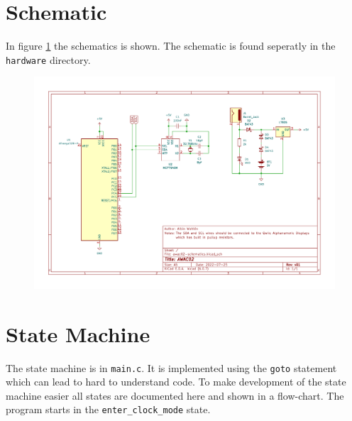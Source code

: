 \documentclass{awac02}
\begin{document}
\section{Schematic}

In figure \ref{fig:schematic} the schematics is shown. The schematic is found
seperatly in the \texttt{hardware} directory.

\begin{figure}[h]
    \includegraphics[width=\textwidth]{../hardware/AWAC02-v01}
    \label{fig:schematic}
\end{figure}

\section{State Machine}

The state machine is in \texttt{main.c}. It is implemented using the
\texttt{goto} statement which can lead to hard to understand code. To make
development of the state machine easier all states are documented here and
shown in a flow-chart. The program starts in the \texttt{enter\_clock\_mode}
state.

\vspace{5mm}

\end{document}
